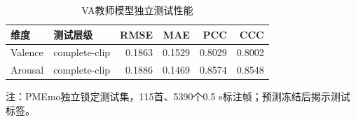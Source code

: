 \begin{table}[htbp]
\centering
\caption{VA教师模型独立测试性能}
\label{tab:teacher-performance}
\begin{tabular}{llrrrr}
\toprule
维度 & 测试层级 & RMSE & MAE & PCC & CCC \\
\midrule
Valence & complete-clip & 0.1863 & 0.1529 & 0.8029 & 0.8002 \\
Arousal & complete-clip & 0.1886 & 0.1469 & 0.8574 & 0.8548 \\
\bottomrule
\end{tabular}
\begin{flushleft}\footnotesize 注：PMEmo独立锁定测试集，115首、5390个0.5 s标注帧；预测冻结后揭示测试标签。\end{flushleft}
\end{table}
